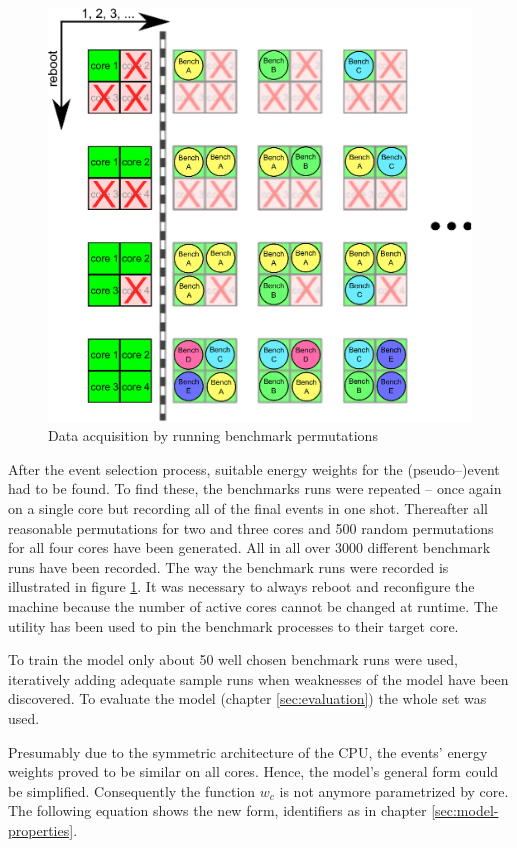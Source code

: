 \begin{figure}
  \centering
    \includegraphics[width=\textwidth]{fig/run-benchmarks.eps}
  \caption{Data acquisition by running benchmark permutations}
  \label{fig:run-benchmarks}
\end{figure}

After the event selection process, suitable energy weights for the
(pseudo--)event had to be found. To find these, the benchmarks runs were
repeated -- once again on a single core but recording all of the final events in
one shot. Thereafter all reasonable permutations for two and three cores and 500
random permutations for all four cores have been generated. All in all over 3000
different benchmark runs have been recorded. The way the benchmark runs were
recorded is illustrated in figure \ref{fig:run-benchmarks}. It was necessary to
always reboot and reconfigure the machine because the number of active cores
cannot be changed at runtime. The \cite{man:taskset} utility has
been used to pin the benchmark processes to their target core.

To train the model only about 50 well chosen benchmark runs were used,
iteratively adding adequate sample runs when weaknesses of the model have been
discovered. To evaluate the model (chapter \ref{sec:evaluation}) the whole set
was used.

Presumably due to the symmetric architecture of the CPU, the events' energy
weights proved to be similar on all cores. Hence, the model's general form could
be simplified. Consequently the function $w_c$ is not anymore parametrized by
core. The following equation shows the new form, identifiers as in chapter
\ref{sec:model-properties}.

